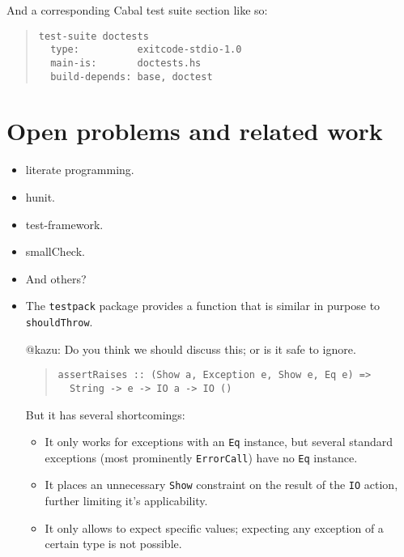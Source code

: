 \documentclass[preprint]{sigplanconf}
\begin{document}
\noindent And a corresponding Cabal test suite section like so:

\begin{quote}
\small
\begin{verbatim}
test-suite doctests
  type:          exitcode-stdio-1.0
  main-is:       doctests.hs
  build-depends: base, doctest
\end{verbatim}
\end{quote}

\section{Open problems and related work}
\begin{itemize}
    \item literate programming.
    \item hunit.
    \item test-framework.
    \item smallCheck.
    \item And others?
    \item The {\tt testpack} package provides a function that is
        similar in purpose to {\tt shouldThrow}.

        @kazu: Do you think we should discuss this; or is it safe to
        ignore.

\begin{quote}\small\begin{verbatim}
assertRaises :: (Show a, Exception e, Show e, Eq e) =>
  String -> e -> IO a -> IO ()
\end{verbatim}\end{quote}
        But it has several shortcomings:
        \begin{itemize}
            \item
                It only works for exceptions with an {\tt Eq}
                instance, but several standard exceptions (most
                prominently {\tt ErrorCall}) have no {\tt Eq}
                instance.
            \item
                It places an unnecessary {\tt Show} constraint on the
                result of the {\tt IO} action, further limiting it's
                applicability.
            \item
                It only allows to expect specific values; expecting
                any exception of a certain type is not possible.
        \end{itemize}
\end{itemize}
\end{document}
